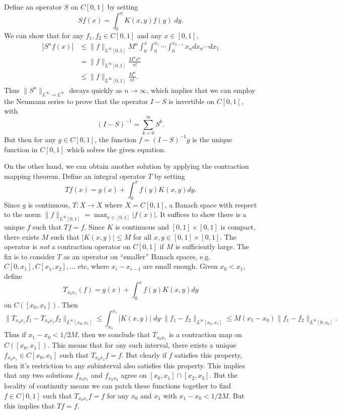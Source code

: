 \documentclass[answers]{exam}
\begin{document}
\begin{questions}
  \begin{solution}
  	Define an operator $S$ on $C[0,1]$ by setting
  	\[ Sf(x) = \int_0^x K(x,y) f(y)\; dy. \]
    We can show that for any $f_{1},f_{2}\in C[0,1]$ and any $x\in [0,1]$,
    \begin{align*}
      |S^n f(x)|
      &\leq \| f \|_{L^\infty[0,1]} M^{n}\int_{0}^{x}\int_{0}^{x_{1}}\cdots \int_{0}^{x_{n-1}}x_{n}dx_{n}\cdots dx_{1}\\
      &=\| f \|_{L^\infty[0,1]} \frac{M^n x^{n}}{n! }\\
      &\leq \| f \|_{L^\infty[0,1]} \frac{M^{n}}{n!}.
    \end{align*}
    Thus $\| S^n \|_{L^\infty \to L^\infty}$ decays quickly as $n \to \infty$, which implies that we can employ the Neumann series to prove that the operator $I - S$ is invertible on $C[0,1]$, with
    \[ (I - S)^{-1} = \sum_{k = 0}^\infty S^k. \]
    But then for any $g \in C[0,1]$, the function $f = (I - S)^{-1} g$ is the unique function in $C[0,1]$ which solves the given equation.

    On the other hand, we can obtain another solution by applying the contraction mapping theorem. Define an integral operator $T$ by setting
    \[ Tf(x) = g(x)+\int_{0}^{x}f(y)K(x,y)dy. \]
    Since $g$ is continuous, $T:X\to X$ where $X=C[0,1]$, a Banach space with respect to the norm $\| f \|_{L^\infty[0,1]} = \max_{x\in[0,1]} |f(x)|$. It suffices to show there is a unique $f$ such that $Tf = f$. Since $K$ is continuous and $[0,1]\times[0,1]$ is compact, there exists $M$ such that $|K(x,y)|\leq M$ for all $x,y\in [0,1]\times[0,1]$. The operator is \emph{not} a contraction operator on $C[0,1]$ if $M$ is sufficiently large. The fix is to consider $T$ as an operator on ``smaller'' Banach spaces, e.g. $C[0,x_1], C[x_1,x_2], \ldots$ etc, where $x_i-x_{i-1}$ are small enough. Given $x_0 < x_1$, define
    \[ T_{x_0 x_1}(f)= g(x)+\int_{0}^{x}f(y)K(x,y)dy \]
    on $C([x_0,x_1])$. Then
    \[ \| T_{x_0 x_1} f_1 - T_{x_0 x_1} f_2 \|_{L^\infty[x_0,x_1]} \leq \int_{x_0}^{x_1} |K(x,y)|\; dy \cdot \| f_1 - f_2 \|_{L^\infty[x_0,x_1]} \leq M(x_1 - x_0) \| f_1 - f_2 \|_{L^\infty[0,x_0]}. \]
    Thus if $x_1 - x_0 < 1/2M$, then we conclude that $T_{x_0 x_1}$ is a contraction map on $C([x_0,x_1])$. This means that for any such interval, there exists a unique $f_{x_0x_1} \in C[x_0,x_1]$ such that $T_{x_0 x_1} f = f$. But clearly if $f$ satisfies this property, then it's restriction to any subinterval also satisfies this property. This implies that any two solutions $f_{x_0x_1}$ and $f_{x_2x_3}$ agree on $[x_0,x_1] \cap [x_2,x_3]$. But the locality of continuity means we can patch these functions together to find $f \in C[0,1]$ such that $T_{x_0x_1} f = f$ for any $x_0$ and $x_1$ with $x_1 - x_0 < 1/2M$. But this implies that $Tf = f$.
\end{solution}


\end{questions}
\end{document}
